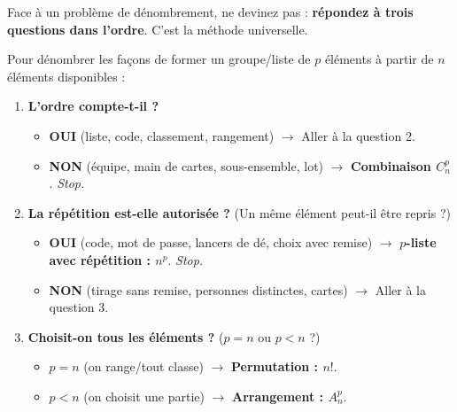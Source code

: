 \documentclass[11pt]{article}
\begin{document}
Face à un problème de dénombrement, ne devinez pas : \textbf{répondez à trois questions dans l'ordre}. C'est la méthode universelle.

\begin{methode}
Pour dénombrer les façons de former un groupe/liste de $p$ éléments à partir de $n$ éléments disponibles :
\begin{enumerate}
    \item \textbf{L'ordre compte-t-il ?}
    \begin{itemize}
        \item \textbf{OUI} (liste, code, classement, rangement) $\rightarrow$ Aller à la question 2.
        \item \textbf{NON} (équipe, main de cartes, sous-ensemble, lot) $\rightarrow$ \textbf{Combinaison $C_n^p$}. \emph{Stop.}
    \end{itemize}
    \item \textbf{La répétition est-elle autorisée ?} (Un même élément peut-il être repris ?)
    \begin{itemize}
        \item \textbf{OUI} (code, mot de passe, lancers de dé, choix avec remise) $\rightarrow$ \textbf{$p$-liste avec répétition : $n^p$}. \emph{Stop.}
        \item \textbf{NON} (tirage sans remise, personnes distinctes, cartes) $\rightarrow$ Aller à la question 3.
    \end{itemize}
    \item \textbf{Choisit-on tous les éléments ?} ($p = n$ ou $p < n$ ?)
    \begin{itemize}
        \item $p = n$ (on range/tout classe) $\rightarrow$ \textbf{Permutation : $n!$}.
        \item $p < n$ (on choisit une partie) $\rightarrow$ \textbf{Arrangement : $A_n^p$}.
    \end{itemize}
\end{enumerate}
\end{methode}
\end{document}
